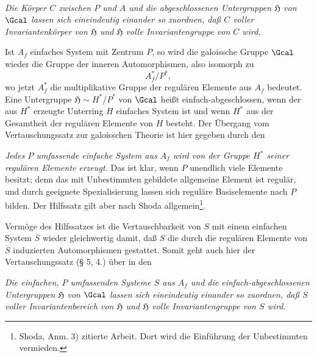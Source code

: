 \begin{center}
\textbf{\\
}
\end{center}

\emph{Die Körper \(C\) zwischen \(P\) und \(A\) und die abgeschlossenen Untergruppen \(\mathfrak H\) von \(\Gcal\) lassen sich eineindeutig einander so zuordnen, daß \(C\) voller Invariantenkörper von \(\mathfrak H\) und \(\mathfrak H\) volle Invariantengruppe von \(C\) wird.}

\noindent\textbf{}
Ist \(A_f\) einfaches System mit Zentrum \(P\), so wird die galoissche Gruppe \(\Gcal\) wieder die Gruppe der inneren Automorphismen, also isomorph zu
\[
        A_f^*/P^*,
\]
wo jetzt \(A_f^*\) die multiplikative Gruppe der regulären Elemente aus \(A_f\) bedeutet. Eine Untergruppe \(\mathfrak H\sim H^*/P^*\) von \(\Gcal\) heißt einfach-abgeschlossen, wenn der aus \(H^*\) erzeugte Unterring \(H\) einfaches System ist und wenn \(H^*\) aus der Gesamtheit der regulären Elemente von \(H\) besteht. Der Übergang vom Vertauschungssatz zur galoisschen Theorie ist hier gegeben durch den

\noindent\textbf{} \emph{Jedes \(P\) umfassende einfache System aus \(A_f\) wird von der Gruppe \(H^*\) seiner regulären Elemente erzeugt.} Das ist klar, wenn \(P\) unendlich viele Elemente besitzt; denn das mit Unbestimmten gebildete \glqq{}allgemeine Element\grqq{} ist regulär, und durch geeignete Spezialisierung lassen sich reguläre Basiselemente nach \(P\) bilden. Der Hilfssatz gilt aber nach Shoda allgemein\footnote{Shoda, Anm. 3) zitierte Arbeit. Dort wird die Einführung der Unbestimmten vermieden.}.

Vermöge des Hilfssatzes ist die Vertauschbarkeit von \(S\) mit einem einfachen System \(\overline S\) wieder gleichwertig damit, daß \(S\) die durch die regulären Elemente von \(\overline S\) induzierten Automorphismen gestattet. Somit geht auch hier der Vertauschungssatz (§ 5, 4.) über in den

\noindent\textbf{} \emph{Die einfachen, \(P\) umfassenden Systeme \(S\) aus \(A_f\) und die einfach-abgeschlossenen Untergruppen \(\mathfrak H\) von \(\Gcal\) lassen sich eineindeutig einander so zuordnen, daß \(S\) voller Invariantenbereich von \(\mathfrak H\) und \(\mathfrak H\) volle Invariantengruppe von \(S\) wird.}

